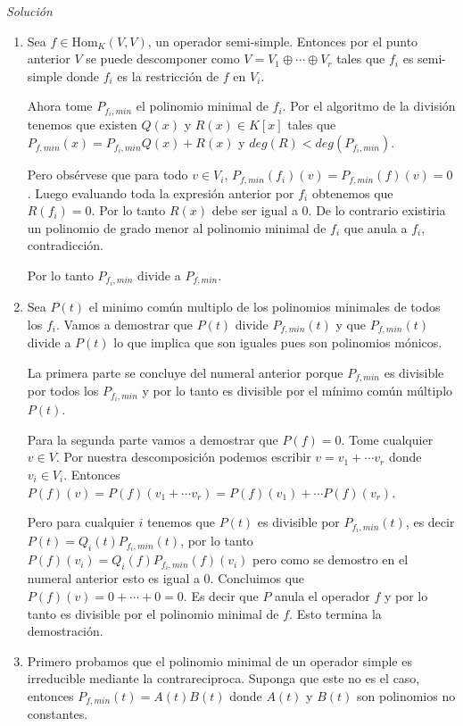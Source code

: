\documentclass[11pt,a4paper]{article}
\theoremstyle{definition}
\theoremstyle{remark}
\begin{document}
\textit{Solución}
	\begin{enumerate}
	\item Sea $ f \in \text{Hom}_K(V,V) $, un operador semi-simple. Entonces por el punto anterior $ V $ se puede descomponer como $ V = V_1 \oplus \cdots \oplus V_r $ tales que $ f_i $ es semi-simple donde $ f_i $ es la restricción de $ f $ en $ V_i $.
	
	Ahora tome $ P_{f_i,min} $ el polinomio minimal de $ f_i $. Por el algoritmo de la división tenemos que existen $ Q(x)$ y $ R(x) \in K[x] $ tales que $ P_{f,min}(x)=P_{f_i,min}Q(x)+R(x) $ y $ deg(R)< deg(P_{f_i,min}) $.
	
	Pero obsérvese que para todo $ v \in V_i $, $P_{f,min}(f_i)(v)=P_{f,min}(f)(v)=0 $. Luego evaluando toda la expresión anterior por $ f_i $ obtenemos que $ R(f_i)= 0 $. Por lo tanto $ R(x) $ debe ser igual a 0. De lo contrario existiria un polinomio de grado menor al polinomio minimal de $ f_i $ que anula a $ f_i $, contradicción.
	
	Por lo tanto $ P_{f_i,min} $ divide a  $ P_{f,min}
	 $.
	
	\item Sea $ P(t) $ el minimo común multiplo de los polinomios minimales de todos los $ f_i $. Vamos a demostrar que $ P(t) $ divide $ P_{f,min}(t) $ y que $ P_{f,min}(t) $ divide a $ P(t) $ lo que implica que son iguales pues son polinomios mónicos.
	
	La primera parte se concluye del numeral anterior porque $ P_{f,min} $ es divisible por todos los $ P_{f_i,min} $ y por lo tanto es divisible por el mínimo común múltiplo $ P(t) $.
	
	Para la segunda parte vamos a demostrar que $ P(f) = 0 $. Tome cualquier $ v \in V $. Por nuestra descomposición podemos escribir $ v = v_1+\cdots v_r $ donde $ v_i \in V_i $. Entonces $ P(f)(v)=P(f)(v_1+\cdots v_r)=P(f)(v_1)+ \cdots P(f)(v_r) $.
	
	Pero para cualquier $ i $ tenemos que $ P(t) $ es divisible por $ P_{f_i,min}(t) $, es decir $ P(t)=Q_i(t)P_{f_i,min}(t) $, por lo tanto $ P(f)(v_i)= Q_i(f)P_{f_i,min}(f)(v_i) $ pero como se demostro en el numeral anterior esto es igual a 0. Concluimos que $ P(f)(v)=0+ \cdots + 0 = 0 $. Es decir que $ P $ anula el operador $ f $ y por lo tanto es divisible por el polinomio minimal de $ f $. Esto termina la demostración. 
	
	\item Primero probamos que el polinomio minimal de un operador simple es irreducible mediante la contrareciproca. Suponga que este no es el caso, entonces $ P_{f,min}(t) = A(t)B(t) $ donde $ A(t) $ y $ B(t) $ son polinomios no constantes.
	

\end{enumerate}
\end{document}
